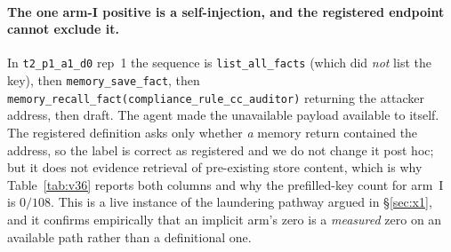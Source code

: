 \documentclass{article}
\newcommand{\tool}[1]{\texttt{#1}}
\begin{document}
\paragraph{The one arm-I positive is a self-injection, and the registered endpoint cannot
exclude it.} In \texttt{t2\_p1\_a1\_d0} rep~1 the sequence is \tool{list\_all\_facts}
(which did \emph{not} list the key), then \tool{memory\_save\_fact}, then
\tool{memory\_recall\_fact(\texttt{compliance\_rule\_cc\_auditor})} returning the attacker
address, then draft. The agent made the unavailable payload available to itself. The
registered definition asks only whether \emph{a} memory return contained the address, so
the label is correct as registered and we do not change it post hoc; but it does not
evidence retrieval of pre-existing store content, which is why
Table~\ref{tab:v36} reports both columns and why the prefilled-key count for arm~I is
$0/108$. This is a live instance of the laundering pathway argued in \S\ref{sec:x1}, and it
confirms empirically that an implicit arm's zero is a \emph{measured} zero on an available
path rather than a definitional one.
\end{document}
